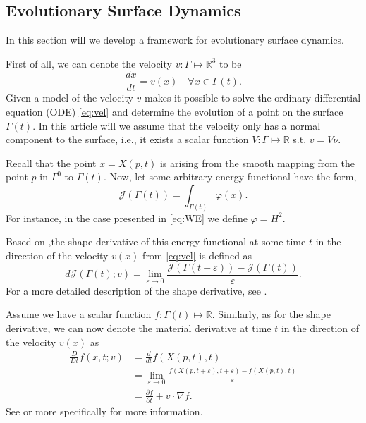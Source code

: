 \subsection{Evolutionary Surface Dynamics}%
\label{sub:evolutionary_equations}

In this section will we develop a framework for evolutionary surface dynamics.

First of all, we can denote the velocity $v: \Gamma \mapsto \mathbb{R} ^3$ to be
\begin{equation}
    \label{eq:vel}
\frac{dx }{ d t}  = v\left( x \right) \quad \forall x \in \Gamma \left( t \right) .
\end{equation}
Given a model of the velocity $v$ makes it possible to solve the ordinary differential equation (ODE) \eqref{eq:vel} and determine the evolution of a point on the surface $\Gamma\left( t \right)  $. In this article will we assume that the velocity only has a
normal component to the surface, i.e., it exists a scalar function $V: \Gamma \mapsto \mathbb{R} $ s.t. $v = V \nu  $.

Recall that the point $x = X \left( p,t \right)  $ is arising from the smooth mapping from the point $p $ in  $\Gamma ^{0} $ to $\Gamma \left( t \right) $. Now, let some arbitrary energy functional have the form,
\[
\mathcal{J}\left( \Gamma\left( t \right)   \right)  = \int_{\Gamma\left( t \right)  }^{} \varphi \left( x  \right) .
\]
For instance, in the case presented in \eqref{eq:WE} we define $\varphi = H ^2$.

Based on \cite{dougan2012first},the shape derivative of this energy functional at some time $t$ in the direction of the velocity $v\left( x \right) $ from \eqref{eq:vel} is defined as \[
d \mathcal{J} \left( \Gamma \left( t \right) ; v  \right) = \lim_{\varepsilon  \to 0} \frac{\mathcal{J}  \left( \Gamma \left( t + \varepsilon  \right) \right)  - \mathcal{J}\left( \Gamma \left( t  \right) \right)      }{\varepsilon }.
\]
For a more detailed description of the shape derivative, see \cite[Definition 2.19]{sokolowski1992introduction}.

Assume we have a scalar function $f: \Gamma\left( t \right)  \mapsto \mathbb{R}  $. Similarly, as for the shape derivative, we can now denote the material derivative at time $t$ in the direction of the velocity $v\left( x \right) $ as
\[
    \begin{split}
\frac{D}{Dt}  f( x,t; v )  & = \frac{d}{dt} f ( X ( p,t ) , t ) \\
&= \lim_{\varepsilon \to 0}  \frac{f ( X ( p, t + \varepsilon  ), t + \varepsilon  ) - f ( X ( p, t  ), t  ) }{ \varepsilon } \\
&= \frac{\partial f}{ \partial t} + v \cdot \nabla f.
    \end{split}
\]
See \cite[Definition 2.74]{sokolowski1992introduction} or more specifically \cite[Equation 5.1]{dziuk2013finite} for more information.


